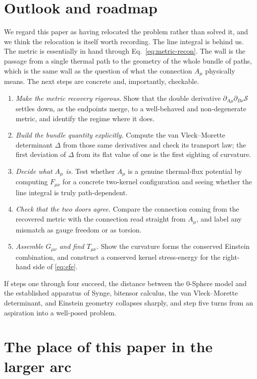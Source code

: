 \documentclass[%
 reprint, amsmath,amssymb, aps, prb, ]{revtex4-2}
\numberwithin{equation}{section}
\begin{document}
\section{Outlook and roadmap}
\label{sec:outlook}

We regard this paper as having relocated the problem rather than solved it, and we think the relocation is itself worth recording. The line integral is behind us. The metric is essentially in hand through Eq.~\eqref{eq:metric-recon}. The wall is the passage from a single thermal path to the geometry of the whole bundle of paths, which is the same wall as the question of what the connection $A_\mu$ physically means. The next steps are concrete and, importantly, checkable.

\begin{enumerate}[leftmargin=2em]
\item \emph{Make the metric recovery rigorous.} Show that the double derivative $\partial_{A\mu}\partial_{B\nu}\mathcal{S}$ settles down, as the endpoints merge, to a well-behaved and non-degenerate metric, and identify the regime where it does.
\item \emph{Build the bundle quantity explicitly.} Compute the van Vleck--Morette determinant $\Delta$ from those same derivatives and check its transport law; the first deviation of $\Delta$ from its flat value of one is the first sighting of curvature.
\item \emph{Decide what $A_\mu$ is.} Test whether $A_\mu$ is a genuine thermal-flux potential by computing $F_{\mu\nu}$ for a concrete two-kernel configuration and seeing whether the line integral is truly path-dependent.
\item \emph{Check that the two doors agree.} Compare the connection coming from the recovered metric with the connection read straight from $A_\mu$, and label any mismatch as gauge freedom or as torsion.
\item \emph{Assemble $G_{\mu\nu}$ and find $T_{\mu\nu}$.} Show the curvature forms the conserved Einstein combination, and construct a conserved kernel stress-energy for the right-hand side of \eqref{eq:efe}.
\end{enumerate}

If steps one through four succeed, the distance between the 0-Sphere model and the established apparatus of Synge, bitensor calculus, the van Vleck--Morette determinant, and Einstein geometry collapses sharply, and step five turns from an aspiration into a well-posed problem.

\section{The place of this paper in the larger arc}
\label{sec:place}
\end{document}

